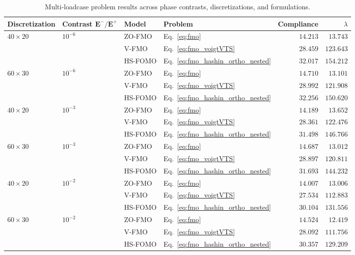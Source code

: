 \documentclass[preprint,3p]{elsarticle}
\newcommand{\tensf}[1]{\bm{\mathbf{#1}}}            %
\newcommand{\Emin}{\tensf{E}^{-}}                   %
\newcommand{\Emax}{\tensf{E}^{+}}                   %
\begin{document}
\begin{table}[!b]
\centering
\small
\setlength{\tabcolsep}{5pt}
\begin{tabular}{l l l l r r}
\hline
Discretization & Contrast $\Emin/\Emax$ & Model & Problem & Compliance & $\lambda$ \\
\hline
$40\times20$ & $10^{-6}$ & ZO-FMO & Eq.~\eqref{eq:fmo} & $14.213$ & $13.743$ \\
 &  & V-FMO & Eq.~\eqref{eq:fmo_voigtVTS} & $28.459$ & $123.643$ \\
 &  & HS-FOMO & Eq.~\eqref{eq:fmo_hashin_ortho_nested} & $32.017$ & $154.212$ \\
\hline
$60\times30$ & $10^{-6}$ & ZO-FMO & Eq.~\eqref{eq:fmo} & $14.710$ & $13.101$ \\
 &  & V-FMO & Eq.~\eqref{eq:fmo_voigtVTS} & $28.992$ & $121.908$ \\
 &  & HS-FOMO & Eq.~\eqref{eq:fmo_hashin_ortho_nested} & $32.256$ & $150.620$ \\
\hline
$40\times20$ & $10^{-3}$ & ZO-FMO & Eq.~\eqref{eq:fmo} & $14.189$ & $13.652$ \\
 &  & V-FMO & Eq.~\eqref{eq:fmo_voigtVTS} & $28.361$ & $122.476$ \\
 &  & HS-FOMO & Eq.~\eqref{eq:fmo_hashin_ortho_nested} & $31.498$ & $146.766$ \\
\hline
$60\times30$ & $10^{-3}$ & ZO-FMO & Eq.~\eqref{eq:fmo} & $14.687$ & $13.012$ \\
 &  & V-FMO & Eq.~\eqref{eq:fmo_voigtVTS} & $28.897$ & $120.811$ \\
 &  & HS-FOMO & Eq.~\eqref{eq:fmo_hashin_ortho_nested} & $31.693$ & $144.232$ \\
\hline
$40\times20$ & $10^{-2}$ & ZO-FMO & Eq.~\eqref{eq:fmo} & $14.007$ & $13.006$ \\
 &  & V-FMO & Eq.~\eqref{eq:fmo_voigtVTS} & $27.534$ & $112.883$ \\
 &  & HS-FOMO & Eq.~\eqref{eq:fmo_hashin_ortho_nested} & $30.104$ & $131.556$ \\
\hline
$60\times30$ & $10^{-2}$ & ZO-FMO & Eq.~\eqref{eq:fmo} & $14.524$ & $12.419$ \\
 &  & V-FMO & Eq.~\eqref{eq:fmo_voigtVTS} & $28.092$ & $111.756$ \\
 &  & HS-FOMO & Eq.~\eqref{eq:fmo_hashin_ortho_nested} & $30.357$ & $129.209$ \\
\hline
\end{tabular}
\caption{Multi-loadcase problem results across phase contrasts, discretizations, and formulations.}
\label{tab:multi_loadcase_summary}
\end{table}
\end{document}
